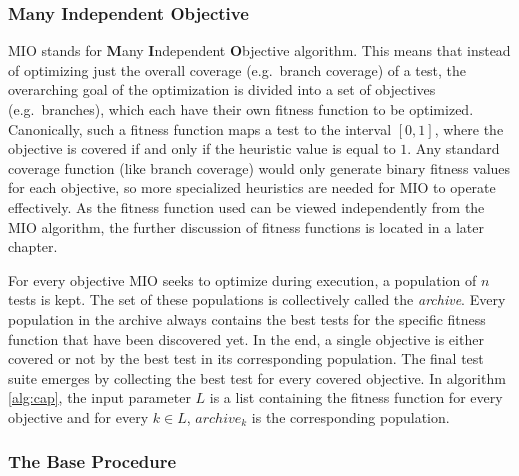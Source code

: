 \documentclass[
  a4paper,  %
  twoside,  %
  bibliography=totoc,
  headsepline,
  cleardoublepage=empty,
  parskip=half,
  draft=false
]{scrbook}
\begin{document}
\subsubsection{Many Independent Objective}

MIO stands for \textbf{M}any \textbf{I}ndependent \textbf{O}bjective algorithm. This means that instead of optimizing just the overall coverage (e.g.~branch coverage) of a test, the overarching goal of the optimization is divided into a set of objectives (e.g.~branches), which each have their own fitness function to be optimized.
Canonically, such a fitness function maps a test to the interval $[0, 1]$, where the objective is covered if and only if the heuristic value is equal to $1$.
Any standard coverage function (like branch coverage) would only generate binary fitness values for each objective, so more specialized heuristics are needed for MIO to operate effectively.
As the fitness function used can be viewed independently from the MIO algorithm, the further discussion of fitness functions is located in a later chapter.

For every objective MIO seeks to optimize during execution, a population of $n$ tests is kept.
The set of these populations is collectively called the \emph{archive}.
Every population in the archive always contains the best tests for the specific fitness function that have been discovered yet.
In the end, a single objective is either covered or not by the best test in its corresponding population.
The final test suite emerges by collecting the best test for every covered objective.
In algorithm \ref{alg:cap}, the input parameter $L$ is a list containing the fitness function for every objective and for every $k \in L$, $archive_k$ is the corresponding population.

\subsubsection{The Base Procedure}
\end{document}
